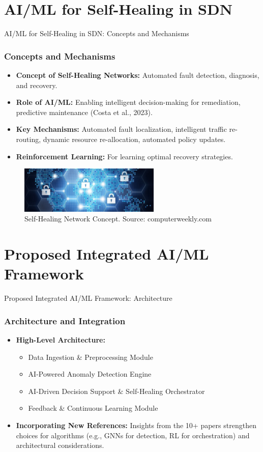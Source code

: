 \documentclass{beamer}
\begin{document}
\section{AI/ML for Self-Healing in SDN}

\begin{frame}{AI/ML for Self-Healing in SDN: Concepts and Mechanisms}
  \frametitle{Concepts and Mechanisms}
  \begin{itemize}
    \item \textbf{Concept of Self-Healing Networks:} Automated fault detection, diagnosis, and recovery.
    \item \textbf{Role of AI/ML:} Enabling intelligent decision-making for remediation, predictive maintenance (Costa et al., 2023).
    \item \textbf{Key Mechanisms:} Automated fault localization, intelligent traffic re-routing, dynamic resource re-allocation, automated policy updates.
    \item \textbf{Reinforcement Learning:} For learning optimal recovery strategies.
  \end{itemize}
  \begin{figure}
    \centering
    \includegraphics[width=0.6\textwidth]{figures/computerweekly_self_healing_network_concept.jpeg}
    \caption{Self-Healing Network Concept. Source: computerweekly.com}
  \end{figure}
\end{frame}

\section{Proposed Integrated AI/ML Framework}

\begin{frame}{Proposed Integrated AI/ML Framework: Architecture}
  \frametitle{Architecture and Integration}
  \begin{itemize}
    \item \textbf{High-Level Architecture:}
    \begin{itemize}
        \item Data Ingestion \& Preprocessing Module
        \item AI-Powered Anomaly Detection Engine
        \item AI-Driven Decision Support \& Self-Healing Orchestrator
        \item Feedback \& Continuous Learning Module
    \end{itemize}
    \item \textbf{Incorporating New References:} Insights from the 10+ papers strengthen choices for algorithms (e.g., GNNs for detection, RL for orchestration) and architectural considerations.
  \end{itemize}
\end{frame}
\end{document}
